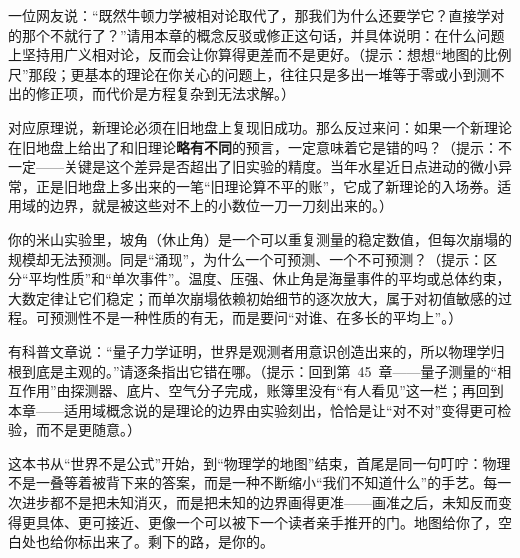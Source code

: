 \begin{puzzles}
\item 一位网友说：“既然牛顿力学被相对论取代了，那我们为什么还要学它？直接学对的那个不就行了？”请用本章的概念反驳或修正这句话，并具体说明：在什么问题上坚持用广义相对论，反而会让你算得更差而不是更好。（提示：想想“地图的比例尺”那段；更基本的理论在你关心的问题上，往往只是多出一堆等于零或小到测不出的修正项，而代价是方程复杂到无法求解。）
\item 对应原理说，新理论必须在旧地盘上复现旧成功。那么反过来问：如果一个新理论在旧地盘上给出了和旧理论\textbf{略有不同}的预言，一定意味着它是错的吗？（提示：不一定——关键是这个差异是否超出了旧实验的精度。当年水星近日点进动的微小异常，正是旧地盘上多出来的一笔“旧理论算不平的账”，它成了新理论的入场券。适用域的边界，就是被这些对不上的小数位一刀一刀刻出来的。）
\item 你的米山实验里，坡角（休止角）是一个可以重复测量的稳定数值，但每次崩塌的规模却无法预测。同是“涌现”，为什么一个可预测、一个不可预测？（提示：区分“平均性质”和“单次事件”。温度、压强、休止角是海量事件的平均或总体约束，大数定律让它们稳定；而单次崩塌依赖初始细节的逐次放大，属于对初值敏感的过程。可预测性不是一种性质的有无，而是要问“对谁、在多长的平均上”。）
\item 有科普文章说：“量子力学证明，世界是观测者用意识创造出来的，所以物理学归根到底是主观的。”请逐条指出它错在哪。（提示：回到第~45~章——量子测量的“相互作用”由探测器、底片、空气分子完成，账簿里没有“有人看见”这一栏；再回到本章——适用域概念说的是理论的边界由实验刻出，恰恰是让“对不对”变得更可检验，而不是更随意。）
\end{puzzles}

这本书从“世界不是公式”开始，到“物理学的地图”结束，首尾是同一句叮咛：物理不是一叠等着被背下来的答案，而是一种不断缩小“我们不知道什么”的手艺。每一次进步都不是把未知消灭，而是把未知的边界画得更准——画准之后，未知反而变得更具体、更可接近、更像一个可以被下一个读者亲手推开的门。地图给你了，空白处也给你标出来了。剩下的路，是你的。
